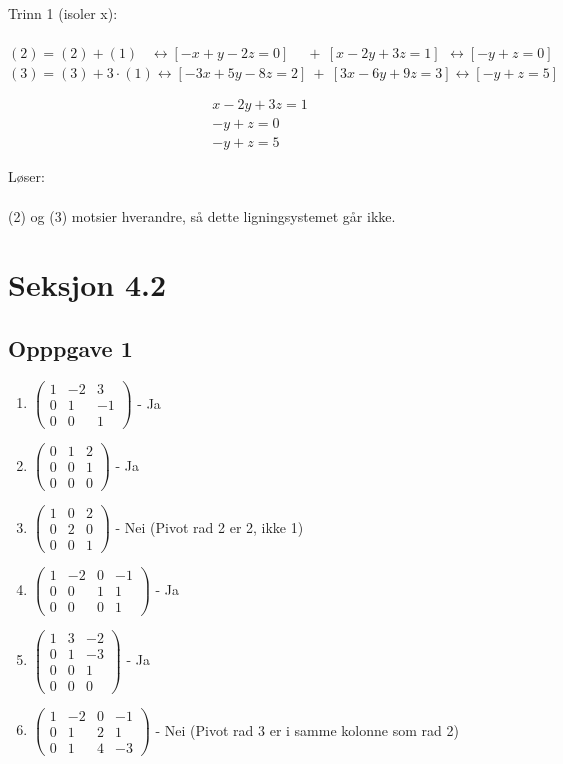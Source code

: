 \documentclass{article}
\newcommand{\lra}{\leftrightarrow}
\newcommand{\trip}{\ \ \ }
\begin{document}
Trinn 1 (isoler x): \\\\
$(2) = (2) + (1) \trip \, \lra [-x+y-2z=0]\quad \ +\ [x-2y+3z=1]\ \, \lra [-y+z=0]$ \\
$(3) = (3) + 3\cdot(1) \lra [-3x+5y-8z=2]\ +\ [3x-6y+9z=3] \lra [-y+z=5]$

\begin{align}
    x-2y+3z=1 \\
    -y+z = 0 \\
    -y+z=5
\end{align}

Løser: \\\\
(2) og (3) motsier hverandre, så dette ligningsystemet går ikke.

\section*{Seksjon 4.2}

\subsection*{Opppgave 1}

\begin{enumerate}[A=]
    \item \( \begin{pmatrix} 1 & -2 & 3 \\ 0 & 1 & -1 \\ 0 & 0 & 1 \end{pmatrix} \) - Ja
    \item \( \begin{pmatrix} 0 & 1 & 2 \\ 0 & 0 & 1 \\ 0 & 0 & 0 \end{pmatrix} \) - Ja
    \item \( \begin{pmatrix} 1 & 0 & 2 \\ 0 & 2 & 0 \\ 0 & 0 & 1 \end{pmatrix} \) - Nei (Pivot rad 2 er 2, ikke 1)
    \item \( \begin{pmatrix} 1 & -2 & 0 & -1 \\ 0 & 0 & 1 & 1 \\ 0 & 0 & 0 & 1 \end{pmatrix} \) - Ja
    \item \( \begin{pmatrix} 1 & 3 & -2 \\ 0 & 1 & -3 \\ 0 & 0 & 1 \\ 0 & 0 & 0 \end{pmatrix} \) - Ja
    \item \( \begin{pmatrix} 1 & -2 & 0 & -1 \\ 0 & 1 & 2 & 1 \\ 0 & 1 & 4 & -3 \end{pmatrix} \) - Nei (Pivot rad 3 er i samme kolonne som rad 2)
\end{enumerate}
\end{document}
